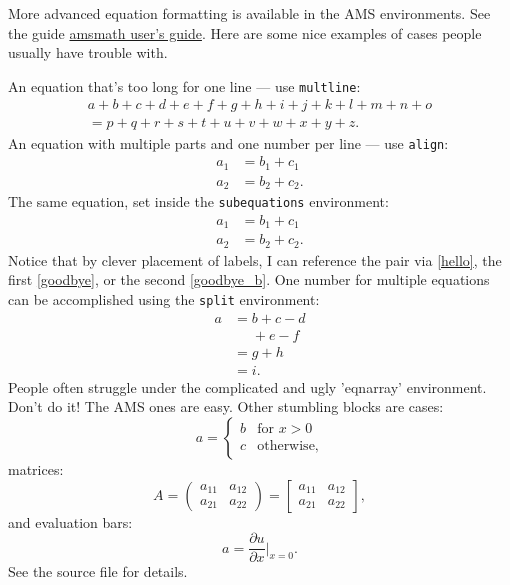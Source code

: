 More advanced equation formatting is available in the AMS environments.  See
the guide \href{ftp://ftp.ams.org/pub/tex/doc/amsmath/amsldoc.pdf}{amsmath
user's guide}.  Here are some nice examples of cases people usually have
trouble with.

An equation that's too long for one line --- use \texttt{multline}:
\begin{multline}
	a +b+c+d+e+f+g+h+i+j+k+l+m+n+o\\ 
	= p+q+r+s+t+u+v+w+x+y+z.
\end{multline}
An equation with multiple parts and one number per line --- use
\texttt{align}:
\begin{align}
	a_1 &= b_1 + c_1\\
	a_2 &= b_2 + c_2.
\end{align}
The same equation, set inside the \texttt{subequations} environment:
\begin{subequations}
	\label{hello}
	\begin{align}
		\label{goodbye}
		a_1 &= b_1 + c_1\\
		\label{goodbye_b}
		a_2 &= b_2 + c_2.
	\end{align}
\end{subequations}
Notice that by clever placement of labels, I can reference the pair via
\eqref{hello}, the first \eqref{goodbye}, or the second \eqref{goodbye_b}.
One number for multiple equations can be accomplished using the
\texttt{split} environment:
\begin{equation}
	\begin{split}
		a &= b + c - d\\
		 &\phantom{=} + e - f\\
		 &= g + h\\
		 &= i.
	\end{split}
\end{equation}
People often struggle under the complicated and ugly 'eqnarray' environment.
Don't do it!  The AMS ones are easy.  Other stumbling blocks are cases:
\begin{equation}
	a = \begin{cases}
		b & \text{for }x > 0\\
		c & \text{otherwise,}
	\end{cases}
\end{equation}
matrices:
\begin{equation}
	A = \begin{pmatrix} a_{11} & a_{12} \\ a_{21} & a_{22} \end{pmatrix}
     = \begin{bmatrix} a_{11} & a_{12} \\ a_{21} & a_{22} \end{bmatrix},
\end{equation}
and evaluation bars:
\begin{equation}
	a = \frac{\partial u}{\partial x}\bigg\lvert_{x=0}.
\end{equation}
See the source file for details.

